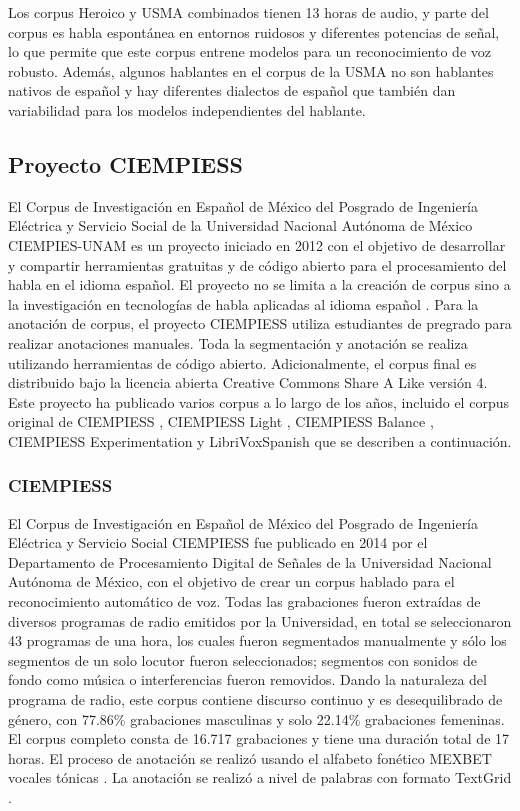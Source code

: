 Los corpus Heroico y USMA combinados tienen 13 horas de audio, y parte del corpus es habla espontánea en entornos ruidosos y diferentes potencias de señal, lo que permite que este corpus entrene modelos para un reconocimiento de voz robusto. Además, algunos hablantes en el corpus de la USMA no son hablantes nativos de español y hay diferentes dialectos de español que también dan variabilidad para los modelos independientes del hablante.

\subsection{Proyecto CIEMPIESS}

El Corpus de Investigación en Español de México del Posgrado de Ingeniería Eléctrica y Servicio Social de la Universidad Nacional Autónoma de México CIEMPIES-UNAM es un proyecto iniciado en 2012 con el objetivo de desarrollar y compartir herramientas gratuitas y de código abierto para el procesamiento del habla en el idioma español. El proyecto no se limita a la creación de corpus sino a la investigación en tecnologías de habla aplicadas al idioma español \cite{CIEMPIESS-Webpage}. Para la anotación de corpus, el proyecto CIEMPIESS utiliza estudiantes de pregrado para realizar anotaciones manuales. Toda la segmentación y anotación se realiza utilizando herramientas de código abierto. Adicionalmente, el corpus final es distribuido bajo la licencia abierta Creative Commons Share A Like versión 4. Este proyecto ha publicado varios corpus a lo largo de los años, incluido el corpus original de CIEMPIESS \cite {CIEMPIESS}, CIEMPIESS Light \cite {CIEMPIESS-LIGHT}, CIEMPIESS Balance \cite {CIEMPIESS-BALANCE}, CIEMPIESS Experimentation \cite {CIEMPIESS-Experimentation} y LibriVoxSpanish \cite {LibriVox-Spanish} que se describen a continuación.

\subsubsection{CIEMPIESS}

El Corpus de Investigación en Español de México del Posgrado de Ingeniería Eléctrica y Servicio Social CIEMPIESS \cite{CIEMPIESS} fue publicado en 2014 por el Departamento de Procesamiento Digital de Señales de la Universidad Nacional Autónoma de México, con el objetivo de crear un corpus hablado para el reconocimiento automático de voz. Todas las grabaciones fueron extraídas de diversos programas de radio emitidos por la Universidad, en total se seleccionaron 43 programas de una hora, los cuales fueron segmentados manualmente y sólo los segmentos de un solo locutor fueron seleccionados; segmentos con sonidos de fondo como música o interferencias fueron removidos. Dando la naturaleza del programa de radio, este corpus contiene discurso continuo y es desequilibrado de género, con 77.86\% grabaciones masculinas y solo 22.14\% grabaciones femeninas. El corpus completo consta de 16.717 grabaciones y tiene una duración total de 17 horas. El proceso de anotación se realizó usando el alfabeto fonético MEXBET vocales tónicas \cite{mexbet}. La anotación se realizó a nivel de palabras con formato TextGrid \cite{TextGrids}.


